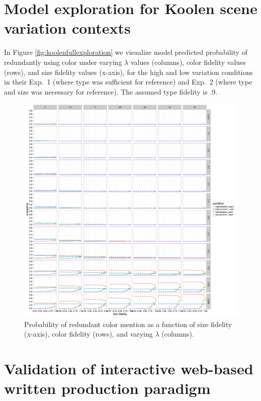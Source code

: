 \documentclass[11pt]{article}
\newcommand{\figref}[1]{Figure \ref{#1}}
\begin{document}
\section{Model exploration for Koolen scene variation contexts}
\label{app:koolenexploration}

In \figref{fig:koolenfullexploration} we visualize model predicted probability of redundantly using color under varying $\lambda$ values (columns), color fidelity values (rows), and size fidelity values (x-axis), for the high and low variation conditions in their Exp.~1 (where type was sufficient for reference) and Exp.~2 (where type and size was necessary for reference). The assumed type fidelity is .9.

\begin{figure}
\includegraphics[width=\textwidth]{pics/koolen-full-exploration}
\caption{Probability of redundant color mention as a function of size fidelity (x-axis), color fidelity (rows), and varying $\lambda$ (columns).}
\label{fig:koolenfullfullexploration}
\end{figure}


\section{Validation of interactive web-based written production paradigm}
\label{app:replication}
\end{document}
